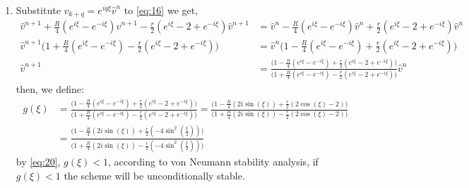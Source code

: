 \documentclass[a4paper,12pt]{article}
\begin{document}
\begin{enumerate}
	\item Substitute $v_{k+q}=e^{iq\xi}\hat{v}^n$ to \eqref{eq:16} we get,
	\begin{equation}\label{eq:19}
	\begin{aligned}
	\hat{v}^{n+1} + \frac{R}{4}(e^{i\xi} - e^{-i\xi}) \hat{v}^{n+1} - \frac{r}{2}(e^{i\xi}-2+e^{-i\xi})\hat{v}^{n+1} &= \hat{v}^n -\frac{R}{4}(e^{i\xi} - e^{-i\xi}) \hat{v}^{n} +\frac{r}{2}(e^{i\xi}-2+e^{-i\xi})\hat{v}^{n}\\
	\hat{v}^{n+1} \bigg( 1 + \frac{R}{4}(e^{i\xi} - e^{-i\xi})- \frac{r}{2}(e^{i\xi}-2+e^{-i\xi}) \bigg) &= \hat{v}^n
	\bigg( 1 -\frac{R}{4}(e^{i\xi} - e^{-i\xi}) +\frac{r}{2}(e^{i\xi}-2+e^{-i\xi}) \bigg)\\
	\hat{v}^{n+1} &= \frac{\bigg( 1 -\frac{R}{4}(e^{i\xi} - e^{-i\xi}) +\frac{r}{2}(e^{i\xi}-2+e^{-i\xi}) \bigg)}{\bigg( 1 + \frac{R}{4}(e^{i\xi} - e^{-i\xi})- \frac{r}{2}(e^{i\xi}-2+e^{-i\xi}) \bigg)}\hat{v}^n
	\end{aligned}
	\end{equation}
	then, we define:
	\begin{equation}\label{eq:20}
	\begin{aligned}
	g(\xi) &= \frac{\bigg( 1 -\frac{R}{4}(e^{i\xi} - e^{-i\xi}) +\frac{r}{2}(e^{i\xi}-2+e^{-i\xi}) \bigg)}{\bigg( 1 + \frac{R}{4}(e^{i\xi} - e^{-i\xi})- \frac{r}{2}(e^{i\xi}-2+e^{-i\xi}) \bigg)} = \frac{\bigg( 1 -\frac{R}{4}(2i\sin(\xi)) +\frac{r}{2}(2\cos(\xi)-2) \bigg)}{\bigg( 1 + \frac{R}{4}(2i\sin(\xi))- \frac{r}{2}(2\cos(\xi)-2) \bigg)}\\ 
	&=\frac{\bigg( 1 -\frac{R}{4}(2i\sin(\xi)) +\frac{r}{2}(-4\sin^2(\frac{\xi}{2})) \bigg)}{\bigg( 1 + \frac{R}{4}(2i\sin(\xi))- \frac{r}{2}(-4\sin^2(\frac{\xi}{2})) \bigg)}
	\end{aligned}
	\end{equation}
	by \eqref{eq:20}, $g(\xi)<1$, according to von Neumann stability analysis, if $g(\xi)<1$ the scheme will be unconditionally stable.
\end{enumerate}
\end{document}
